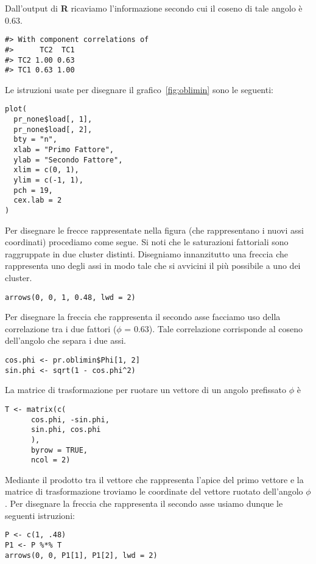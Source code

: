 \begin{exmp}
Dall'output di \textbf{R} ricaviamo l'informazione secondo cui il coseno di tale angolo è 0.63. 
\begin{lstlisting}
#> With component correlations of 
#>      TC2  TC1
#> TC2 1.00 0.63
#> TC1 0.63 1.00
\end{lstlisting}
Le istruzioni usate per disegnare il grafico~\ref{fig:oblimin} sono le seguenti:
\begin{lstlisting}
plot(
  pr_none$load[, 1], 
  pr_none$load[, 2], 
  bty = "n",  
  xlab = "Primo Fattore", 
  ylab = "Secondo Fattore", 
  xlim = c(0, 1), 
  ylim = c(-1, 1), 
  pch = 19, 
  cex.lab = 2
) 
\end{lstlisting} 
Per disegnare le frecce rappresentate nella figura (che rappresentano i nuovi assi coordinati) procediamo come segue. Si noti che le saturazioni fattoriali sono raggruppate in due cluster distinti. Disegniamo innanzitutto una freccia che rappresenta uno degli assi in modo tale che si avvicini il più possibile a uno dei cluster.  
\begin{lstlisting} 
arrows(0, 0, 1, 0.48, lwd = 2)  
\end{lstlisting}  
Per disegnare la freccia che rappresenta il secondo asse facciamo uso della correlazione tra i due fattori ($\phi$ = 0.63). 
Tale correlazione corrisponde al coseno dell'angolo che separa i due assi.  
\begin{lstlisting} 
cos.phi <- pr.oblimin$Phi[1, 2] 
sin.phi <- sqrt(1 - cos.phi^2)
\end{lstlisting} 
 La matrice di trasformazione per ruotare un vettore di un angolo prefissato $\phi$ è
\begin{lstlisting} 
T <- matrix(c(
      cos.phi, -sin.phi,
      sin.phi, cos.phi
      ), 
      byrow = TRUE, 
      ncol = 2)
\end{lstlisting} 
Mediante il prodotto tra il vettore che rappresenta l'apice del primo vettore e la matrice di trasformazione troviamo le coordinate del vettore ruotato dell'angolo $\phi$. Per disegnare la freccia che rappresenta il secondo asse usiamo dunque le seguenti istruzioni: 
\begin{lstlisting}
P <- c(1, .48)
P1 <- P %*% T
arrows(0, 0, P1[1], P1[2], lwd = 2) 
\end{lstlisting}

\end{exmp}

